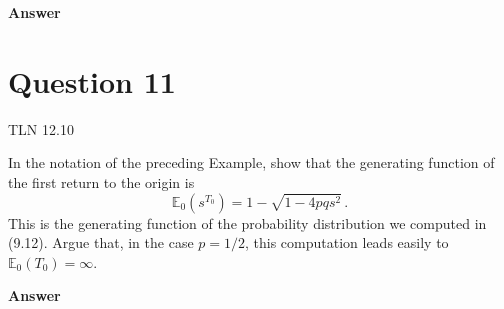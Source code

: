 \documentclass[letterpaper]{article}
\begin{document}
		\textbf{Answer}
		
		\clearpage
		
		\section{Question 11}
		
		
		{\color{deepred} TLN  12.10} 
		
		In the notation of the preceding Example, show that the generating function of the first return to the origin is
		\[
		\mathbb{E}_0\!\left(s^{T_0}\right) = 1 - \sqrt{1 - 4pqs^2}\,.
		\]
		This is the generating function of the probability distribution we computed in (9.12). Argue that, in the case $p = 1/2$, this computation leads easily to $\mathbb{E}_0(T_0) = \infty$.
		
		\textbf{Answer}
		
		\clearpage
		
		
	
\end{document}
